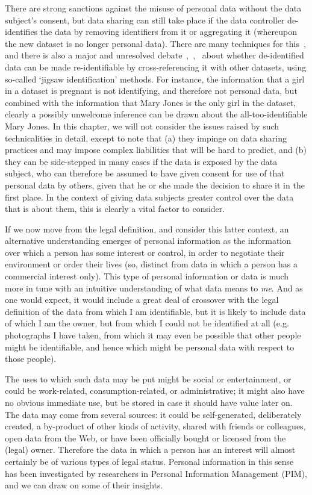\documentclass[graybox]{svmult}
\begin{document}
There are strong sanctions against the misuse of personal data without the data subject’s consent, but data sharing can still take place if the data controller de-identifies the data by removing identifiers from it or aggregating it (whereupon the new dataset is no longer personal data). There are many techniques for this~\cite{yang2012}, and there is also a major and unresolved debate~\cite{ohm2010},~\cite{cavoukian2011},~\cite{narayanan2010} about whether de-identified data can be made re-identifiable by cross-referencing it with other datasets, using so-called `jigsaw identification’ methods. For instance, the information that a girl in a dataset is pregnant is not identifying, and therefore not personal data, but combined with the information that Mary Jones is the only girl in the dataset, clearly a possibly unwelcome inference can be drawn about the all-too-identifiable Mary Jones. In this chapter, we will not consider the issues raised by such technicalities in detail, except to note that (a) they impinge on data sharing practices and may impose complex liabilities that will be hard to predict, and (b) they can be side-stepped in many cases if the data is exposed by the data subject, who can therefore be assumed to have given consent for use of that personal data by others, given that he or she made the decision to share it in the first place. In the context of giving data subjects greater control over the data that is about them, this is clearly a vital factor to consider.

If we now move from the legal definition, and consider this latter context, an alternative understanding emerges of personal information as the information over which a person has some interest or control, in order to negotiate their environment or order their lives (so, distinct from data in which a person has a commercial interest only). This type of personal information or data is much more in tune with an intuitive understanding of what data means to {\em me}. And as one would expect, it would include a great deal of crossover with the legal definition of the data from which I am identifiable, but it is likely to include data of which I am the owner, but from which I could not be identified at all (e.g. photographs I have taken, from which it may even be possible that other people might be identifiable, and hence which might be personal data with respect to those people).

The uses to which such data may be put might be social or entertainment, or could be work-related, consumption-related, or administrative; it might also have no obvious immediate use, but be stored in case it should have value later on. The data may come from several sources: it could be self-generated, deliberately created, a by-product of other kinds of activity, shared with friends or colleagues, open data from the Web, or have been officially bought or licensed from the (legal) owner. Therefore the data in which a person has an interest will almost certainly be of various types of legal status. Personal information in this sense has been investigated by researchers in Personal Information Management (PIM), and we can draw on some of their insights.
\end{document}
